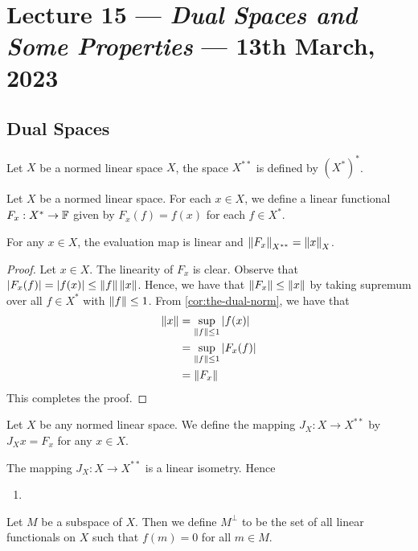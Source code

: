 \section{Lecture 15 --- \textit{Dual Spaces and Some Properties} --- 13th March, 2023}

\horz

\subsection{Dual Spaces}

\begin{definition}
    Let $X$ be a normed linear space $X$, the space $X^{**}$ is defined by $\left( X^* \right) ^{*}$. 
    \label{def:the-dual-map}
\end{definition}

\begin{definition}
    Let $X$ be a normed linear space. For each $x\in X$, we define a linear functional $F_{x} : X^* \to \mathbb F$ given by $F_{x} (f)= f(x)$ for each $f \in X^{*}$.
    \label{def:the-dual-element}
\end{definition}

\begin{lemma}
    For any $x\in X$, the evaluation map is linear and $\left\lVert F_x \right\rVert_{X^{**}} = \left\lVert x \right\rVert_{X}$.
    \label{lem:cont-norm-eval-map}
\end{lemma}
\begin{proof}
    Let $x\in X$. The linearity of $F_x$ is clear. Observe that $\left\lvert F_x (f) \right\rvert = \left\lvert f(x) \right\rvert \le \left\lVert f \right\rVert \left\lVert x \right\rVert$. Hence, we have that $\left\lVert F_x \right\rVert \le \left\lVert x \right\rVert$ by taking supremum over all $f\in X^*$ with $\left\lVert f \right\rVert \le 1$. From \ref{cor:the-dual-norm}, we have that 
    \begin{align*}
	\left\lVert x \right\rVert &= \sup_{\left\lVert f \right\rVert\le 1} \left\lvert f(x) \right\rvert \\
	&= \sup_{\left\lVert f \right\rVert \le 1} \left\lvert F_{x} (f) \right\rvert \\
	&= \left\lVert F_{x} \right\rVert
    \end{align*}
    This completes the proof.
\end{proof}

\begin{definition}
    Let $X$ be any normed linear space. We define the mapping $J_X : X \to X^{**}$ by $J_{X} x = F_{x}$ for any $x\in X$.
    \label{def:the-isometry}
\end{definition}

\begin{lemma}
    The mapping $J_{X} : X \to X^{**}$ is a linear isometry. Hence
    \begin{enumerate}[label=\alph*]
	\item 
    \end{enumerate}
    \label{def:isometry-dual}
\end{lemma}

\begin{definition}
    Let $M$ be a subspace of $X$. Then we define $M^{\perp}$ to be the set of all linear functionals on $X$ such that $f(m)=0$ for all $m\in M$.
    \label{def:perp-in-banach-space}
\end{definition}

